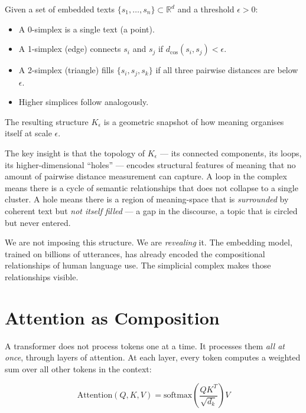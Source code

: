 \documentclass[12pt,a4paper]{article}
\begin{document}
\begin{tcolorbox}[colback=white, colframe=black!30, title={\sffamily\small Definition: Simplicial Complex from Embeddings}]
Given a set of embedded texts $\{s_1, \ldots, s_n\} \subset \mathbb{R}^d$ and a threshold $\epsilon > 0$:
\begin{itemize}
\item A 0-simplex is a single text (a point).
\item A 1-simplex (edge) connects $s_i$ and $s_j$ if $d_{\cos}(s_i, s_j) < \epsilon$.
\item A 2-simplex (triangle) fills $\{s_i, s_j, s_k\}$ if all three pairwise distances are below $\epsilon$.
\item Higher simplices follow analogously.
\end{itemize}
The resulting structure $K_\epsilon$ is a geometric snapshot of how meaning organises itself at scale $\epsilon$.
\end{tcolorbox}

The key insight is that the topology of $K_\epsilon$ --- its connected components, its loops, its higher-dimensional ``holes'' --- encodes structural features of meaning that no amount of pairwise distance measurement can capture. A loop in the complex means there is a cycle of semantic relationships that does not collapse to a single cluster. A hole means there is a region of meaning-space that is \emph{surrounded} by coherent text but \emph{not itself filled} --- a gap in the discourse, a topic that is circled but never entered.

We are not imposing this structure. We are \emph{revealing} it. The embedding model, trained on billions of utterances, has already encoded the compositional relationships of human language use. The simplicial complex makes those relationships visible.

\section{Attention as Composition}

A transformer does not process tokens one at a time. It processes them \emph{all at once}, through layers of attention. At each layer, every token computes a weighted sum over all other tokens in the context:

\begin{equation}
\text{Attention}(Q, K, V) = \text{softmax}\!\left(\frac{QK^T}{\sqrt{d_k}}\right) V
\end{equation}
\end{document}
